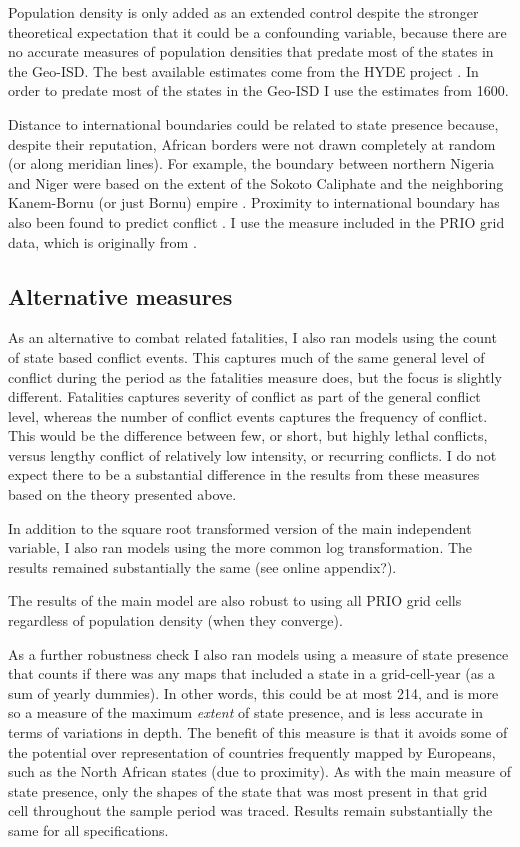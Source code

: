 \documentclass[12pt]{article}
\begin{document}
Population density is only added as an extended control despite the stronger
theoretical expectation that it could be a confounding variable, because there
are no accurate measures of population densities that predate most of the
states in the Geo-ISD. The best available estimates come from the HYDE project
\citep{Goldewijk2016}. In order to predate most of the states in the Geo-ISD I
use the estimates from 1600.

Distance to international boundaries could be related to state presence because,
despite their reputation, African borders were not drawn completely at random
(or along meridian lines). For example, the boundary between northern Nigeria and
Niger were based on the extent of the Sokoto Caliphate and the neighboring
Kanem-Bornu (or just Bornu) empire \citep{HiribarrenVincent2017AHoB}. Proximity
to international boundary has also been found to predict conflict
\citep{Buhaug2002}. I use the measure included in the PRIO grid data, which is
originally from \citet{Weidmann2010a}.

\subsection{Alternative measures}

As an alternative to combat related fatalities, I also ran models using the
count of state based conflict events. This captures much of the same general
level of conflict during the period as the fatalities measure does, but the
focus is slightly different. Fatalities captures severity of conflict as part of
the general conflict level, whereas the number of conflict events captures the
frequency of conflict. This would be the difference between few, or short, but
highly lethal conflicts, versus lengthy conflict of relatively low
intensity, or recurring conflicts. I do not expect there to be a substantial
difference in the results from these measures based on the theory presented
above.

In addition to the square root transformed version of the main independent
variable, I also ran models using the more common log transformation. The
results remained substantially the same (see online appendix?). 

The results of the main model are also robust to using all PRIO grid cells
regardless of population density (when they converge).

As a further robustness check I also ran models using a measure of state
presence that counts if there was any maps that included a state in a
grid-cell-year (as a sum of yearly dummies). In other words, this could be at
most 214, and is more so a measure of the maximum \textit{extent} of state
presence, and is less accurate in terms of variations in depth. The benefit of
this measure is that it avoids some of the potential over representation of
countries frequently mapped by Europeans, such as the North African states (due
to proximity). As with the main measure of state presence, only the shapes of
the state that was most present in that grid cell throughout the sample period
was traced. Results remain substantially the same for all specifications.
\end{document}
